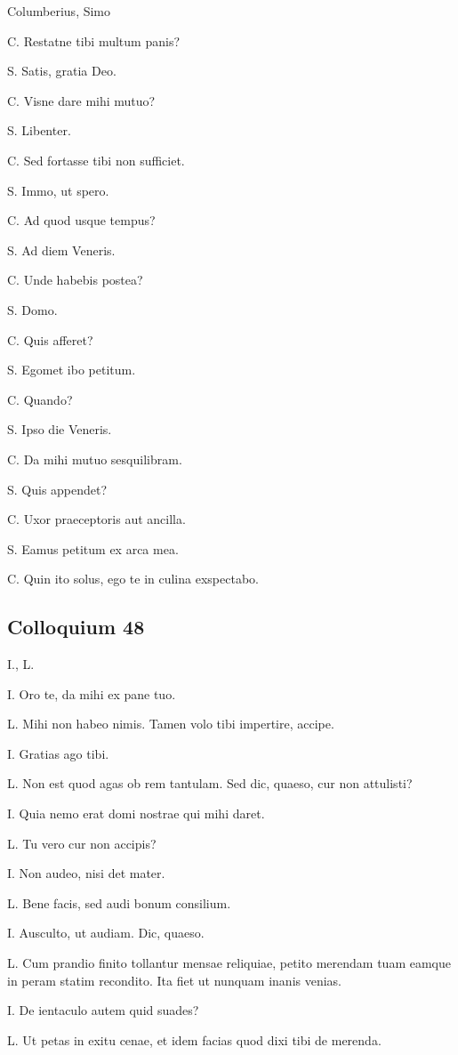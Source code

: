\documentclass{article}
\begin{document}
Columberius, Simo

C. Restatne tibi multum panis?

S. Satis, gratia Deo.

C. Visne dare mihi mutuo?

S. Libenter.

C. Sed fortasse tibi non sufficiet.

S. Immo, ut spero.

C. Ad quod usque tempus?

S. Ad diem Veneris.

C. Unde habebis postea?

S. Domo.

C. Quis afferet?

S. Egomet ibo petitum.

C. Quando?

S. Ipso die Veneris.

C. Da mihi mutuo sesquilibram.

S. Quis appendet?

C. Uxor praeceptoris aut ancilla.

S. Eamus petitum ex arca mea.

 
C. Quin ito solus, ego te in culina exspectabo.

\subsection{Colloquium 48}
I., L.

I. Oro te, da mihi ex pane tuo.

 
L. Mihi non habeo nimis. Tamen volo tibi impertire, accipe.

I. Gratias ago tibi.

L. Non est quod agas ob rem tantulam. Sed dic, quaeso, cur non attulisti?

I. Quia nemo erat domi nostrae qui mihi daret.

L. Tu vero cur non accipis?

I. Non audeo, nisi det mater.

L. Bene facis, sed audi bonum consilium.

I. Ausculto, ut audiam. Dic, quaeso.

L. Cum prandio finito tollantur mensae reliquiae, petito merendam tuam eamque in peram statim recondito. Ita fiet ut nunquam inanis venias.

I. De ientaculo autem quid suades?

L. Ut petas in exitu cenae, et idem facias quod dixi tibi de merenda.
\end{document}
